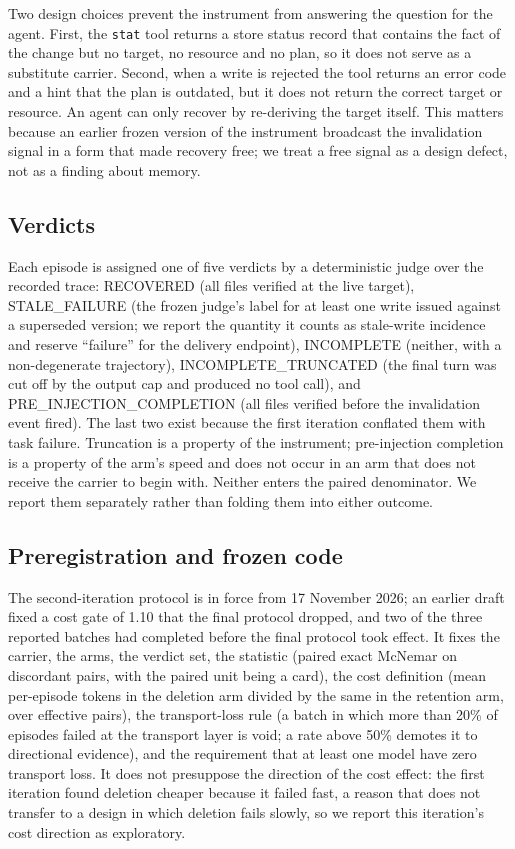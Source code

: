 \documentclass[11pt]{article}
\begin{document}
\begin{sloppypar}
Two design choices prevent the instrument from answering the question for the agent. First, the \texttt{stat} tool returns a store status record that contains the fact of the change but no target, no resource and no plan, so it does not serve as a substitute carrier. Second, when a write is rejected the tool returns an error code and a hint that the plan is outdated, but it does not return the correct target or resource. An agent can only recover by re-deriving the target itself. This matters because an earlier frozen version of the instrument broadcast the invalidation signal in a form that made recovery free; we treat a free signal as a design defect, not as a finding about memory.

\subsection{Verdicts}

Each episode is assigned one of five verdicts by a deterministic judge over the recorded trace: RECOVERED (all files verified at the live target), STALE\_FAILURE (the frozen judge's label for at least one write issued against a superseded version; we report the quantity it counts as stale-write incidence and reserve ``failure'' for the delivery endpoint), INCOMPLETE (neither, with a non-degenerate trajectory), INCOMPLETE\_TRUNCATED (the final turn was cut off by the output cap and produced no tool call), and PRE\_INJECTION\_COMPLETION (all files verified before the invalidation event fired). The last two exist because the first iteration conflated them with task failure. Truncation is a property of the instrument; pre-injection completion is a property of the arm's speed and does not occur in an arm that does not receive the carrier to begin with. Neither enters the paired denominator. We report them separately rather than folding them into either outcome.

\subsection{Preregistration and frozen code}

The second-iteration protocol is in force from 17 November 2026; an earlier draft fixed a cost gate of 1.10 that the final protocol dropped, and two of the three reported batches had completed before the final protocol took effect. It fixes the carrier, the arms, the verdict set, the statistic (paired exact McNemar on discordant pairs, with the paired unit being a card), the cost definition (mean per-episode tokens in the deletion arm divided by the same in the retention arm, over effective pairs), the transport-loss rule (a batch in which more than 20\% of episodes failed at the transport layer is void; a rate above 50\% demotes it to directional evidence), and the requirement that at least one model have zero transport loss. It does not presuppose the direction of the cost effect: the first iteration found deletion cheaper because it failed fast, a reason that does not transfer to a design in which deletion fails slowly, so we report this iteration's cost direction as exploratory.


\end{sloppypar}
\end{document}
